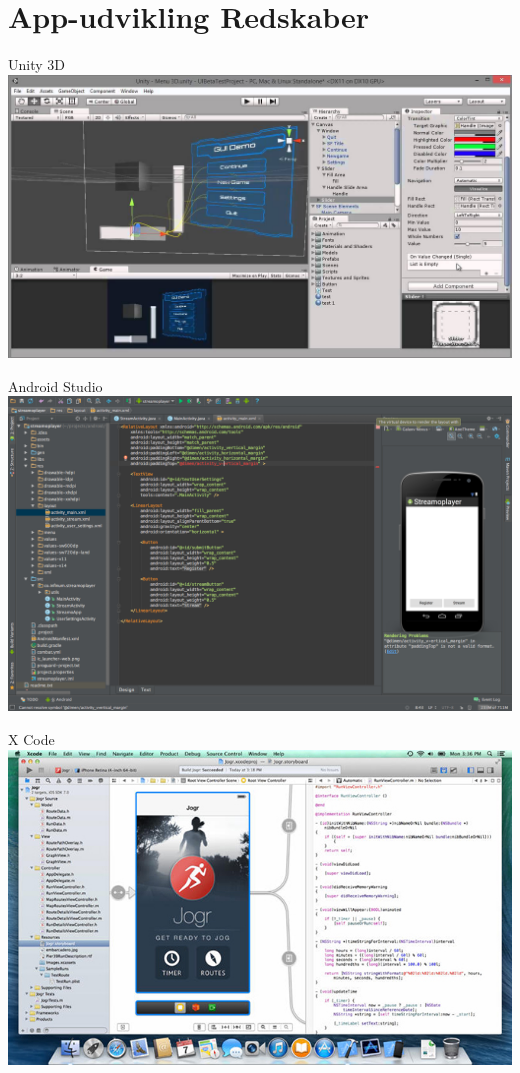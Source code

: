 \documentclass[10pt]{beamer}
\begin{document}
\section{App-udvikling Redskaber}
\begin{frame}{Unity 3D}
	\centering
	\includegraphics[width=\linewidth]{img/unity3dui.jpg}
\end{frame}

\begin{frame}{Android Studio}
	\centering
	\includegraphics[width=\linewidth]{img/androidstudio.png}
\end{frame}

\begin{frame}{X Code}
	\centering
	\includegraphics[width=\linewidth]{img/xcode.png}
\end{frame}
\end{document}
